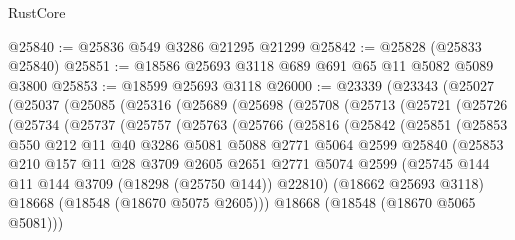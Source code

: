 \begin{lexlean}{RustCore}
\begin{coremodule}
@25840 := @25836 @549 @3286 @21295 @21299
@25842 := @25828 (@25833 @25840)
@25851 := @18586 @25693 @3118 @689 @691 @65 @11 @5082 @5089 @3800
@25853 := @18599 @25693 @3118
@26000 := @23339
    (@23343
      (@25027
        (@25037
          (@25085
            (@25316
              (@25689
                (@25698
                  (@25708
                    (@25713
                      (@25721
                        (@25726
                          (@25734
                            (@25737
                              (@25757
                                (@25763
                                  (@25766
                                    (@25816
                                      (@25842
                                        (@25851
                                          (@25853
                                            @550
                                            @212
                                            @11
                                            @40
                                            @3286
                                            @5081
                                            @5088
                                            @2771
                                            @5064
                                            @2599
                                            @25840
                                            (@25853
                                              @210
                                              @157
                                              @11
                                              @28
                                              @3709
                                              @2605
                                              @2651
                                              @2771
                                              @5074
                                              @2599
                                              (@25745
                                                @144
                                                @11
                                                @144
                                                @3709
                                                (@18298 (@25750 @144))
                                                @22810)
                                              (@18662 @25693 @3118)
                                              @18668
                                              (@18548 (@18670 @5075 @2605)))
                                            @18668
                                            (@18548 (@18670 @5065 @5081)))

\end{coremodule}
\end{lexlean}
